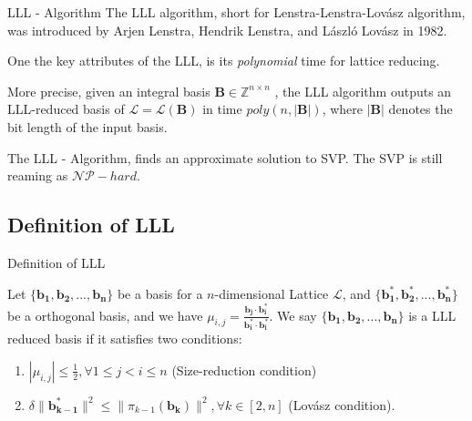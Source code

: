 \documentclass[aspectratio=169]{beamer}
\begin{document}
    \begin{frame}{LLL - Algorithm}
        The LLL algorithm, short for Lenstra-Lenstra-Lovász algorithm, was introduced by Arjen Lenstra, Hendrik Lenstra, and László Lovász in 1982. 

        \hfill
        
        One the key attributes of the LLL, is its \emph{polynomial} time for lattice reducing. 
        
        \begin{block}{}
            More precise, given an integral basis $\mathbf{B} \in \mathbb{Z}^{n\times n}$ , the LLL algorithm outputs an LLL-reduced basis of $\mathcal{L} = \mathcal{L}(\mathbf{B})$ in time $poly(n, |\mathbf{B}|)$, where $|\mathbf{B}|$ denotes the bit length of the input basis.
        \end{block}

        \hfill

        The LLL - Algorithm, finds an approximate solution to SVP. The SVP is still reaming as $\mathcal{NP} - hard$.

    \end{frame}

    \subsection{Definition of LLL}
    
    \begin{frame}{Definition of LLL}
        \begin{definition}
            Let $\mathbf{\{b_1, b_2, ..., b_n\}}$ be a basis for a $n$-dimensional Lattice $\mathcal{L}$, and $\mathbf{\{b_1^*, b_2^*, ..., b_n^*\}}$ be a orthogonal basis, and we have $\mu_{i,j} = \frac{\mathbf{b_j \cdot b_i^*}}{\mathbf{b_i^* \cdot b_i^*}}$. We say $\mathbf{\{b_1, b_2, ...,b_n\}}$ is a LLL reduced basis if it satisfies two conditions:
            \begin{enumerate}
                \item $|\mu_{i,j}| \leq \frac{1}{2}, \forall 1 \leq j < i \leq n$ (Size-reduction condition)  
                \item $\delta\|\mathbf{b_{k-1}^*}\|^2 \leq \|\pi_{k-1}(\mathbf{b_k})\|^2, \forall k \in [2, n]$ (Lovász condition).
            \end{enumerate}
        \end{definition}
        
    \end{frame}
\end{document}

